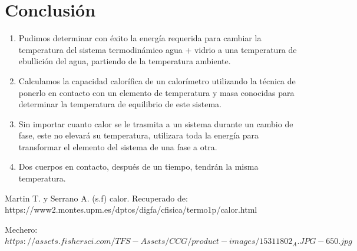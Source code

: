 \documentclass[journal,transmag]{IEEEtran}
\begin{document}
\section{Conclusión}
	
	\begin{enumerate}[label=(\roman*)]
		\item Pudimos determinar con éxito la energía requerida para cambiar la temperatura del sistema termodinámico agua + vidrio a una temperatura de ebullición del agua, partiendo de la temperatura ambiente. 
		\item  Calculamos la capacidad calorífica de un calorímetro utilizando la técnica de ponerlo en contacto con un elemento de temperatura y masa conocidas para determinar la temperatura de equilibrio de este sistema. 
		\item  Sin importar cuanto calor se le trasmita a un sistema durante un cambio de fase, este no elevará su temperatura, utilizara toda la energía para transformar el elemento del sistema de una fase a otra.
		\item Dos cuerpos en contacto, después de un tiempo, tendrán la misma temperatura.
	\end{enumerate}

\appendices


\ifCLASSOPTIONcaptionsoff
  \newpage
\fi


\begin{thebibliography}{1}


 Martin T. y Serrano A. (s.f) calor. Recuperado de: https://www2.montes.upm.es/dptos/digfa/cfisica/termo1p/calor.html

 Mechero: $https://assets.fishersci.com/TFS-Assets/CCG/product-images/15311802_A.JPG-650.jpg $

\end{thebibliography}
\end{document}
